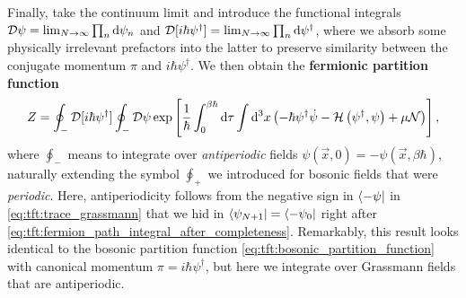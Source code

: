 Finally, take the continuum limit and introduce the functional integrals $\mathcal{D} \psi = \lim_{N \rightarrow \infty} \prod_n \mathop{}\!\mathrm{d} \psi_n$ and $\mathcal{D} [i \hbar \psi^\dagger] = \lim_{N \rightarrow \infty} \prod_n \mathop{}\!\mathrm{d} \psi^\dagger$, where we absorb some physically irrelevant prefactors into the latter to preserve similarity between the conjugate momentum $\pi$ and $i \hbar \psi^\dagger$. 
We then obtain the \textbf{fermionic partition function}
\begin{equation}
	Z = \oint_- \mathcal{D} [i \hbar \psi^\dagger] \oint_- \mathcal{D} \psi \exp \left[ \frac{1}{\hbar} \int_0^{\beta \hbar} \mathop{}\!\mathrm{d} \tau \int \mathop{}\!\mathrm{d}^3 x \left( -\hbar \psi^\dagger \dot{\psi} - \mathcal{H} \left( \psi^\dagger, \psi \right) + \mu \mathcal{N} \right) \right] ,
\label{eq:tft:fermion_partition_function}
\end{equation}
where $\oint_-$ means to integrate over \emph{antiperiodic} fields $\psi(\vec{x}, 0) = -\psi(\vec{x}, \beta \hbar)$, naturally extending the symbol $\oint_+$ we introduced for bosonic fields that were \emph{periodic}.
Here, antiperiodicity follows from the negative sign in $\bra{-\psi}$ in \cref{eq:tft:trace_grassmann} that we hid in $\bra{\psi_{N+1}} = \bra{-\psi_0}$ right after \cref{eq:tft:fermion_path_integral_after_completeness}.
Remarkably, this result looks identical to the bosonic partition function \eqref{eq:tft:bosonic_partition_function} with canonical momentum $\pi = i \hbar \psi^\dagger$, but here we integrate over Grassmann fields that are antiperiodic.

\iffalse
The partition function is therefore
\begin{equation}
\begin{split}
	Z &= \int \dif \psi_0^\dagger \int \dif \psi_0 \, e^{-\psi_{n+1}^\dagger \psi_{n+1}} \braket{-\psi_0 | e^{-\beta(\hat{H} - \mu \hat{N})} | \psi_0} \\
	  &= \prod_n \int \dif \psi_n^\dagger \int \dif \psi_n \, e^{-\psi_{n+1}^\dagger \psi_{n+1}} \braket{\psi_{n+1} | e^{-(\hat{H} - \mu \hat{N}) \Delta \tau / \hbar} | \psi_n} \\
	  &= \prod_n \int \dif \psi_n^\dagger \int \dif \psi_n \, e^{-\psi_{n+1}^\dagger \psi_{n+1}} \braket{\psi_{n+1} | \psi_n} e^{-(H_n - \mu N) \Delta \tau / \hbar} \\
	  &= \prod_n \int \dif \psi_n^\dagger \int \dif \psi_n \, \exp \left\{ -\frac{\Delta t}{\hbar} \sum_n \int \dif^3 x \left( \psi^\dagger_{n+1} \frac{\psi_{n+1} - \psi_n}{\Delta t} + \ham - \mu \numdensity \right) \right\} \\
	  &= \oint_- \pathintdif \psi^\dagger \oint_- \pathintdif \psi \exp \left\{ \frac{1}{\hbar} \int_0^{\beta \hbar} \dif \tau \int \dif^3 x \left( -\psi^\dagger(\vec{x},\tau) \dot{\psi}(\vec{x},\tau) - \ham \left( \psi^\dagger(\vec{x},\tau), \psi(\vec{x},\tau) \right) + \mu \numdensity \right) \right\} \\
\end{split}
\end{equation}
\fi

